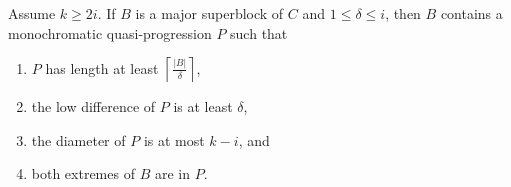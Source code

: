 \begin{theorem}\label{thm:GreedyMajorJump} Assume $k \geq 2i$. If $B$ is a major superblock of $C$ and $1 \leq \delta \leq i$, then $B$ contains a monochromatic quasi-progression $P$ such that 
\begin{enumerate}
   \item\label{en:GreedyMaSBJ1} $P$ has length at least $\left\lceil \frac{|B|}{\delta} \right\rceil$,
   \item\label{en:GreedyMaSBJ2} the low difference of $P$ is at least $\delta$,
   \item\label{en:GreedyMaSBJ3} the diameter of $P$ is at most $k-i$, and
   \item\label{en:GreedyMaSBJ4} both extremes of $B$ are in $P$.
\end{enumerate}
\end{theorem}
